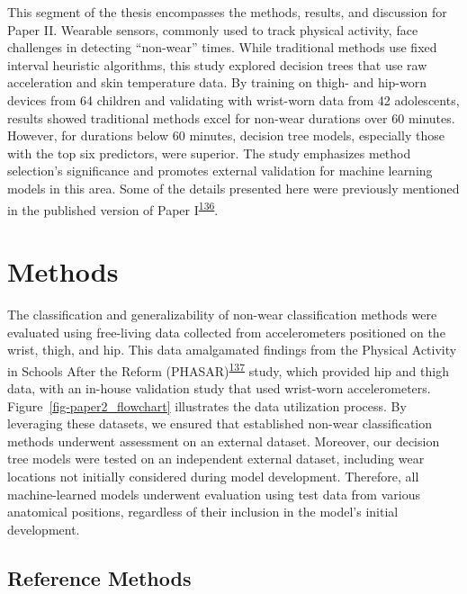\documentclass[
  10pt,
]{scrbook}
\begin{document}
This segment of the thesis encompasses the methods, results, and
discussion for Paper II. Wearable sensors, commonly used to track
physical activity, face challenges in detecting ``non-wear'' times.
While traditional methods use fixed interval heuristic algorithms, this
study explored decision trees that use raw acceleration and skin
temperature data. By training on thigh- and hip-worn devices from 64
children and validating with wrist-worn data from 42 adolescents,
results showed traditional methods excel for non-wear durations over 60
minutes. However, for durations below 60 minutes, decision tree models,
especially those with the top six predictors, were superior. The study
emphasizes method selection's significance and promotes external
validation for machine learning models in this area. Some of the details
presented here were previously mentioned in the published version of
Paper
I\textsuperscript{\protect\hyperlink{ref-skovgaard_generalizability_2023}{136}}.

\hypertarget{methods-1}{%
\section{Methods}\label{methods-1}}

The classification and generalizability of non-wear classification
methods were evaluated using free-living data collected from
accelerometers positioned on the wrist, thigh, and hip. This data
amalgamated findings from the Physical Activity in Schools After the
Reform
(PHASAR)\textsuperscript{\protect\hyperlink{ref-pedersen_protocol_2018}{137}}
study, which provided hip and thigh data, with an in-house validation
study that used wrist-worn accelerometers.
Figure~\ref{fig-paper2_flowchart} illustrates the data utilization
process. By leveraging these datasets, we ensured that established
non-wear classification methods underwent assessment on an external
dataset. Moreover, our decision tree models were tested on an
independent external dataset, including wear locations not initially
considered during model development. Therefore, all machine-learned
models underwent evaluation using test data from various anatomical
positions, regardless of their inclusion in the model's initial
development.

\hypertarget{reference-methods}{%
\subsection{Reference Methods}\label{reference-methods}}
\end{document}
